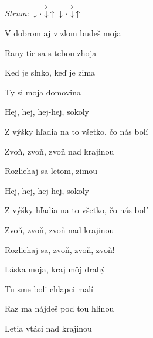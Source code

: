 \begin{song}


\begin{strumbox}
\textit{Strum:} $\Down\Miss\AccentDown\Up\ \Down\Miss\AccentDown\Up$
\end{strumbox}

\begin{vchordbox}
\vspace{3em}
\end{vchordbox}

\Large

\bigskip

 \par
{} V dobrom aj v zlom budeš moja \par
{} Rany tie sa s tebou zhoja \par
{}Keď je slnko, keď je zima \par
{}Ty si moja domovina \par

\bigskip

\begin{chorusbox}{\Refren}
Hej, hej, hej-hej, sokoly \par
{}Z výšky hľadia na to všetko, čo nás bolí \par
{}Zvoň, zvoň, zvoň nad krajinou \par
{}Rozliehaj sa letom, zimou \par

\bigskip

Hej, hej, hej-hej, sokoly \par
{}Z výšky hľadia na to všetko, čo nás bolí \par
{}Zvoň, zvoň, zvoň nad krajinou \par
{}Rozliehaj sa, zvoň, zvoň, zvoň! \par
\end{chorusbox}

\bigskip

 \par
{}Láska moja, kraj môj drahý \par
{}Tu sme boli chlapci malí \par
{}Raz ma nájdeš pod tou hlinou \par
{}Letia vtáci nad krajinou \par


\end{song}
